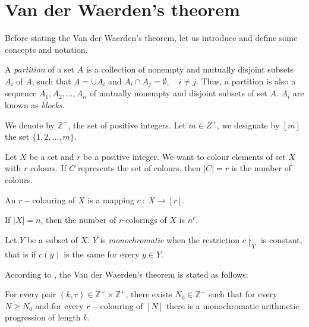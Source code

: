 \section{Van der Waerden's theorem}

Before stating the Van der Waerden's theorem, let us introduce and define some concepts and notation.

A \textit{partition} of a set $A$ is a collection of nonempty and mutually disjoint subsets $A_i$ of $A$, such that  $A=\cup A_i$ and $A_i \cap A_j=\emptyset, \quad i\neq j.$ Thus, a partition is also a sequence $A_1, A_2, \ldots, A_n$ of mutually nonempty and  disjoint subsets of set $A$. $A_i$ are known as \textit{blocks}.

We denote by $\mathbb{Z}^+$, the set of positive integers.
Let $m \in \mathit{Z}^+$, we designate by $[m]$ the set $\{1,2, \ldots, m\}.$

Let $X$ be a set and $r$ be a positive integer. We want to colour elements of set $X$ with $r$ colours. If $C$ represents the set of colours, then $|C|=r$ is the number of colours.

\begin{defn} An $r-$colouring of $X$ is a mapping $c \ : \ X \longrightarrow [r].$  \label{rcol}\end{defn}


If $|X|=n$, then the number of $r$-colorings of $X$ is $n^r.$


Let $Y$ be a subset of $X.$ $Y$ is \textit{monochromatic} when the restriction $c\restriction_Y$ is constant, that is   if $c(y)$ is the same for every $y \in Y.$


According to \cite{polymath2012new} , the Van der Waerden's theorem is stated as follows:

\begin{thm}
For every pair $(k,r) \in \mathbb{Z}^+ \times \mathbb{Z}^+$, there exists $N_0 \in \mathbb{Z}^+$ such that for every $N \geq N_0$ and for 
every $r-$colouring of $[N]$ there is a monochromatic arithmetic progression of length $k.$  \label{vd1}
\end{thm}

